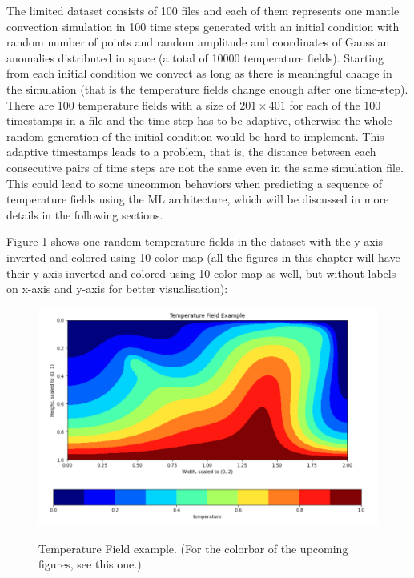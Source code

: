 The limited dataset consists of 100 files and each of them represents one mantle convection simulation in 100 time steps generated with an initial condition with random number of points and random amplitude and coordinates of Gaussian anomalies distributed in space (a total of 10000 temperature fields). Starting from each initial condition we convect as long as there is meaningful change in the simulation (that is the temperature fields change enough after one time-step). There are 100 temperature fields with a size of $201 \times 401$ for each of the 100 timestamps in a file and the time step has to be adaptive, otherwise the whole random generation of the initial condition would be hard to implement. This adaptive timestamps leads to a problem, that is, the distance between each consecutive pairs of time steps are not the same even in the same simulation file. This could lead to some uncommon behaviors when predicting a sequence of temperature fields using the ML architecture, which will be discussed in more details in the following sections.

Figure \ref{figure:temperature_field_sample} shows one random temperature fields in the dataset with the y-axis inverted and colored using 10-color-map (all the figures in this chapter will have their y-axis inverted and colored using 10-color-map as well, but without labels on x-axis and y-axis for better visualisation):

\begin{figure}[H]
    \caption{Temperature Field example. (For the colorbar of the upcoming figures, see this one.)}
    \includegraphics[scale=0.6]{figures/mantle_convection_images/temperature_field_example.png}
    \label{figure:temperature_field_sample}
\end{figure}

